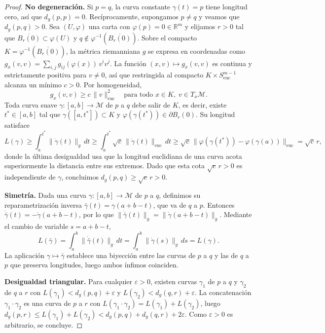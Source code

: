 \begin{proof}
\textbf{No degeneración.} Si $p = q$, la curva constante $\gamma(t) = p$ tiene longitud cero, así que $d_g(p,p) = 0$. Recíprocamente, supongamos $p \neq q$ y veamos que $d_g(p,q) > 0$. Sea $(U, \varphi)$ una carta con $\varphi(p) = 0 \in \mathbb{R}^m$ y elijamos $r > 0$ tal que $\overline{B_r(0)} \subset \varphi(U)$ y $q \notin \varphi^{-1}(\overline{B_r(0)})$. Sobre el compacto $K = \varphi^{-1}(\overline{B_r(0)})$, la métrica riemanniana $g$ se expresa en coordenadas como $g_x(v,v) = \sum_{i,j} g_{ij}(\varphi(x))\, v^i v^j$. La función $(x,v) \mapsto g_x(v,v)$ es continua y estrictamente positiva para $v \neq 0$, así que restringida al compacto $K \times S^{m-1}_{\text{euc}}$ alcanza un mínimo $c > 0$. Por homogeneidad,
\[
g_x(v,v) \geq c\,\|v\|_{\text{euc}}^2 \quad \text{para todo } x \in K,\; v \in T_x\mathcal{M}.
\]
Toda curva suave $\gamma: [a,b] \to \mathcal{M}$ de $p$ a $q$ debe salir de $K$, es decir, existe $t^* \in [a,b]$ tal que $\gamma([a,t^*]) \subset K$ y $\varphi(\gamma(t^*)) \in \partial B_r(0)$. Su longitud satisface
\[
L(\gamma) \geq \int_a^{t^*} \|\dot\gamma(t)\|_g\, dt \geq \int_a^{t^*} \sqrt{c}\,\|\dot\gamma(t)\|_{\text{euc}}\, dt \geq \sqrt{c}\,\|\varphi(\gamma(t^*)) - \varphi(\gamma(a))\|_{\text{euc}} = \sqrt{c}\, r,
\]
donde la última desigualdad usa que la longitud euclidiana de una curva acota superiormente la distancia entre sus extremos. Dado que esta cota $\sqrt{c}\, r > 0$ es independiente de $\gamma$, concluimos $d_g(p,q) \geq \sqrt{c}\, r > 0$.

\textbf{Simetría.} Dada una curva $\gamma: [a,b] \to \mathcal{M}$ de $p$ a $q$, definimos su reparametrización inversa $\bar\gamma(t) = \gamma(a+b-t)$, que va de $q$ a $p$. Entonces $\dot{\bar\gamma}(t) = -\dot\gamma(a+b-t)$, por lo que $\|\dot{\bar\gamma}(t)\|_g = \|\dot\gamma(a+b-t)\|_g$. Mediante el cambio de variable $s = a+b-t$,
\[
L(\bar\gamma) = \int_a^b \|\dot{\bar\gamma}(t)\|_g\, dt = \int_a^b \|\dot\gamma(s)\|_g\, ds = L(\gamma).
\]
La aplicación $\gamma \mapsto \bar\gamma$ establece una biyección entre las curvas de $p$ a $q$ y las de $q$ a $p$ que preserva longitudes, luego ambos ínfimos coinciden.

\textbf{Desigualdad triangular.} Para cualquier $\varepsilon > 0$, existen curvas $\gamma_1$ de $p$ a $q$ y $\gamma_2$ de $q$ a $r$ con $L(\gamma_1) < d_g(p,q) + \varepsilon$ y $L(\gamma_2) < d_g(q,r) + \varepsilon$. La concatenación $\gamma_1 \cdot \gamma_2$ es una curva de $p$ a $r$ con $L(\gamma_1 \cdot \gamma_2) = L(\gamma_1) + L(\gamma_2)$, luego $d_g(p,r) \leq L(\gamma_1) + L(\gamma_2) < d_g(p,q) + d_g(q,r) + 2\varepsilon$. Como $\varepsilon > 0$ es arbitrario, se concluye.
\end{proof}

